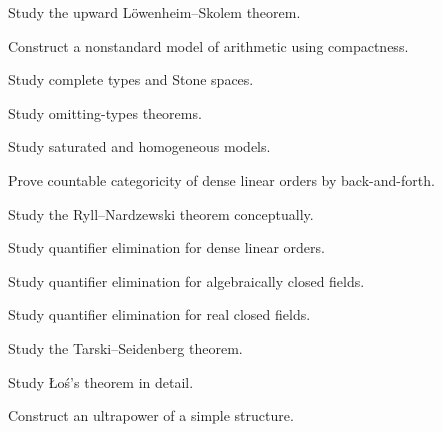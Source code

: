 \begin{exercise}[4]
Study the upward Löwenheim--Skolem theorem.
\end{exercise}

\begin{exercise}[4]
Construct a nonstandard model of arithmetic using compactness.
\end{exercise}

\begin{exercise}[4]
Study complete types and Stone spaces.
\end{exercise}

\begin{exercise}[4]
Study omitting-types theorems.
\end{exercise}

\begin{exercise}[4]
Study saturated and homogeneous models.
\end{exercise}

\begin{exercise}[4]
Prove countable categoricity of dense linear orders by back-and-forth.
\end{exercise}

\begin{exercise}[4]
Study the Ryll--Nardzewski theorem conceptually.
\end{exercise}

\begin{exercise}[4]
Study quantifier elimination for dense linear orders.
\end{exercise}

\begin{exercise}[4]
Study quantifier elimination for algebraically closed fields.
\end{exercise}

\begin{exercise}[4]
Study quantifier elimination for real closed fields.
\end{exercise}

\begin{exercise}[4]
Study the Tarski--Seidenberg theorem.
\end{exercise}

\begin{exercise}[4]
Study Łoś's theorem in detail.
\end{exercise}

\begin{exercise}[4]
Construct an ultrapower of a simple structure.
\end{exercise}

